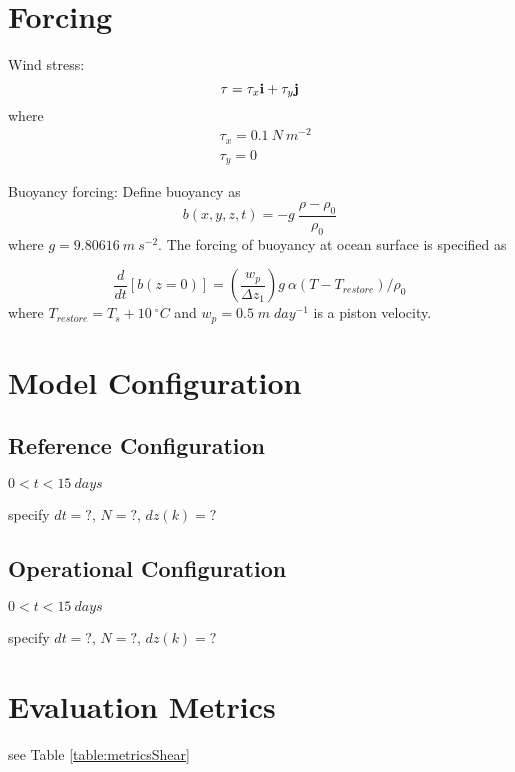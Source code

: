 \documentclass[fleqn, 12pt]{report}
\begin{document}
\section{Forcing}

Wind stress:
\begin{equation*}
{\bf \tau} = \tau_x {\bf i} + \tau_y {\bf j} \\
\end{equation*}
where
\begin{align*}
&\tau_x= 0.1 \ N \ m^{-2} \\
&\tau_y=0
\end{align*}

Buoyancy forcing:
Define buoyancy as
\begin{equation}
b(x,y,z,t) = -g \ \frac{\rho-\rho_0}{\rho_0}
\end{equation}
where $g=9.80616 \ m \ s^{-2}$. The forcing of buoyancy at ocean surface is specified as

\begin{equation}
\frac{d}{dt} \left[ b(z=0) \right] = \left( \frac{w_p}{\Delta z_1} \right) g \ \alpha \left(T - T_{restore} \right) / \rho_0
\end{equation}
where $T_{restore}=T_s+10\ ^{\circ}C$ and $w_p = 0.5 \;m\;day^{-1}$ is a piston velocity.

\section{Model Configuration}
\subsection{Reference Configuration}
 $0<t<15 \ days$
 
 specify $dt=?$, $N=?$, $dz(k)=?$

\subsection{Operational Configuration}
 $0<t<15 \ days$
 
 specify $dt=?$, $N=?$, $dz(k)=?$

\section{Evaluation Metrics}
see Table \ref{table:metricsShear}
\end{document}

